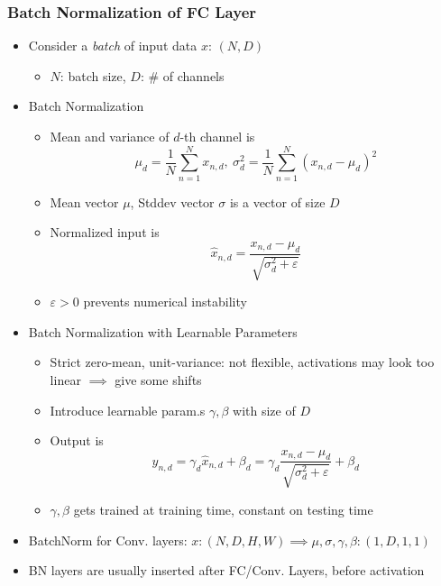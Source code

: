 \subsubsection*{Batch Normalization of FC Layer}
\begin{itemize}
    \item Consider a \textit{batch} of input data $x$: $(N,D)$
    \begin{itemize}
        \item $N$: batch size, $D$: \# of channels
    \end{itemize}
    \item Batch Normalization
    \begin{itemize}
        \item Mean and variance of $d$-th channel is
        \begin{equation}
            \mu_d=\frac{1}{N}\sum_{n=1}^Nx_{n,d},~\sigma_d^2=\frac{1}{N}\sum_{n=1}^N\left(x_{n,d}-\mu_d\right)^2
        \end{equation}
        \item Mean vector $\mu$, Stddev vector $\sigma$ is a vector of size $D$
        \item Normalized input is
        \begin{equation}
            \hat{x}_{n,d}=\frac{x_{n,d}-\mu_d}{\sqrt{\sigma_d^2+\varepsilon}}
        \end{equation}
        \item $\varepsilon>0$ prevents numerical instability
    \end{itemize}
    \item Batch Normalization with Learnable Parameters
    \begin{itemize}
        \item Strict zero-mean, unit-variance: not flexible, activations may look too linear $\implies$ give some shifts
        \item Introduce learnable param.s $\gamma,\beta$ with size of $D$
        \item Output is
        \begin{equation}
            y_{n,d}=\gamma_d\hat{x}_{n,d}+\beta_d=\gamma_d\frac{x_{n,d}-\mu_d}{\sqrt{\sigma_d^2+\varepsilon}}+\beta_d
        \end{equation}
        \item $\gamma,\beta$ gets trained at training time, constant on testing time
    \end{itemize}
    \item BatchNorm for Conv. layers: $x:(N,D,H,W)\implies\mu,\sigma,\gamma,\beta:(1,D,1,1)$
    \item BN layers are usually inserted after FC/Conv. Layers, before activation
\end{itemize}

